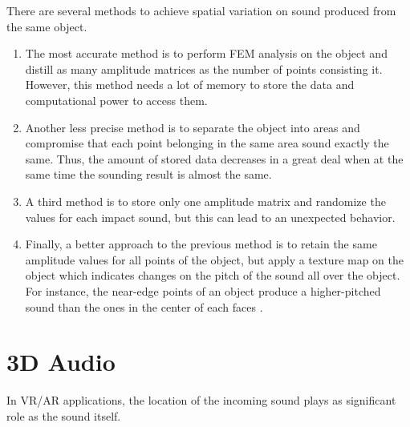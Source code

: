 There are several methods to achieve spatial variation on sound produced from the same object. 
\begin{enumerate}
\item The most accurate method is to perform FEM analysis on the object and distill as many amplitude matrices as the number of points consisting it. However, this method needs a lot of memory to store the data and computational power to access them.
\item Another less precise method is to separate the object into areas and compromise that each point belonging in the same area sound exactly the same. Thus, the amount of stored data decreases in a great deal when at the same time the sounding result is almost the same.
\item A third method is to store only one amplitude matrix and randomize the values for each impact sound, but this can lead to an unexpected behavior.
\item Finally, a better approach to the previous method is to retain the same amplitude values for all points of the object, but apply a texture map on the object which indicates changes on the pitch of the sound all over the object. For instance, the near-edge points of an object produce a higher-pitched sound than the ones in the center of each faces \cite{lloyd2011sound}. 
\end{enumerate}

\section{3D Audio}
In VR/AR applications, the location of the incoming sound plays as significant role as the sound itself. 

